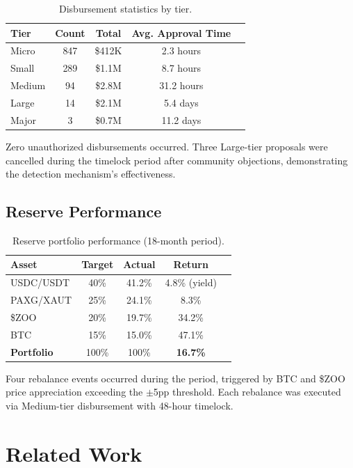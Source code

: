 \documentclass[11pt,letterpaper]{article}
\begin{document}
\begin{table}[t]
\centering
\begin{tabular}{lcccc}
\toprule
\textbf{Tier} & \textbf{Count} & \textbf{Total} & \textbf{Avg. Approval Time} \\
\midrule
Micro & 847 & \$412K & 2.3 hours \\
Small & 289 & \$1.1M & 8.7 hours \\
Medium & 94 & \$2.8M & 31.2 hours \\
Large & 14 & \$2.1M & 5.4 days \\
Major & 3 & \$0.7M & 11.2 days \\
\bottomrule
\end{tabular}
\caption{Disbursement statistics by tier.}
\label{tab:disbursements}
\end{table}

Zero unauthorized disbursements occurred. Three Large-tier proposals were cancelled during the timelock period after community objections, demonstrating the detection mechanism's effectiveness.

\subsection{Reserve Performance}

\begin{table}[t]
\centering
\begin{tabular}{lcccc}
\toprule
\textbf{Asset} & \textbf{Target} & \textbf{Actual} & \textbf{Return} \\
\midrule
USDC/USDT & 40\% & 41.2\% & 4.8\% (yield) \\
PAXG/XAUT & 25\% & 24.1\% & 8.3\% \\
\$ZOO & 20\% & 19.7\% & 34.2\% \\
BTC & 15\% & 15.0\% & 47.1\% \\
\midrule
\textbf{Portfolio} & 100\% & 100\% & \textbf{16.7\%} \\
\bottomrule
\end{tabular}
\caption{Reserve portfolio performance (18-month period).}
\label{tab:performance}
\end{table}

Four rebalance events occurred during the period, triggered by BTC and \$ZOO price appreciation exceeding the $\pm$5pp threshold. Each rebalance was executed via Medium-tier disbursement with 48-hour timelock.

\section{Related Work}
\end{document}

